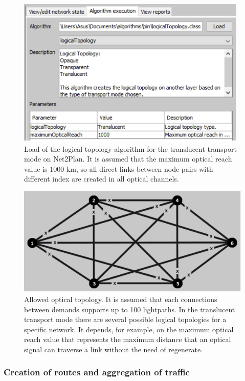 \begin{figure}[H]
\centering
\includegraphics[width=11cm]{sdf/heuristic/translucent_survivability/figures/logical_topology_load_translucent}
\caption{Load of the logical topology algorithm for the translucent transport mode on Net2Plan. It is assumed that the maximum optical reach value is 1000 km, so all direct links between node pairs with different index are created in all optical channels.}
\label{logical_topology_load_translucent}
\end{figure}

\begin{figure}[H]
\centering
\includegraphics[width=13cm]{sdf/heuristic/translucent_survivability/figures/allowed_optical}
\caption{Allowed optical topology. It is assumed that each connections between demands supports up to 100 lightpaths. In the translucent transport mode there are several possible logical topologies for a specific network. It depends, for example, on the maximum optical reach value that represents the maximum distance that an optical signal can traverse a link without the need of regenerate.}
\label{allowed_optical_surv_translucent}
\end{figure}

\subsubsection{Creation of routes and aggregation of traffic}

